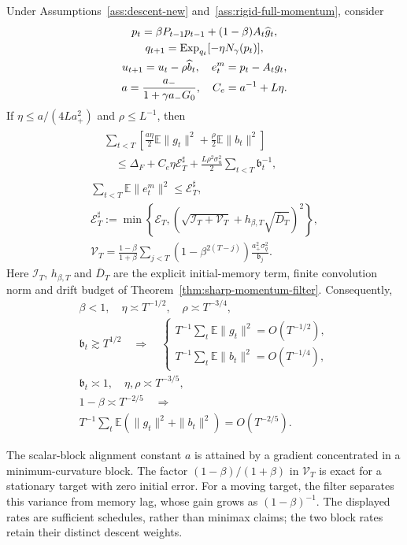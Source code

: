 \begin{theorem}
Under Assumptions~\ref{ass:descent-new} and~\ref{ass:rigid-full-momentum}, consider
\begin{gather}
 p_t=\beta P_{t-1}p_{t-1}+(1-\beta)A_t\widehat g_t,\\
 q_{t+1}=\operatorname{Exp}_{q_t}[-\eta N_\gamma(p_t)],\\
 u_{t+1}=u_t-\rho\widehat b_t,\quad e_t^m=p_t-A_tg_t,\\
 a=\frac{a_-}{1+\gamma a_-G_0},\quad C_e=a^{-1}+L\eta.
\end{gather}
If $\eta\le a/(4La_+^2)$ and $\rho\le L^{-1}$, then
\begin{gather}
 \begin{aligned}
 &\sum_{t<T}\left[\frac{a\eta}{2}\mathbb E\|g_t\|^2+
 \frac\rho2\mathbb E\|b_t\|^2\right]\\
 &\quad\le\Delta_F+C_e\eta\mathscr E_T^\sharp+
 \frac{L\rho^2\sigma_u^2}{2}\sum_{t<T}\mathfrak b_t^{-1},
 \end{aligned}\\
 \sum_{t<T}\mathbb E\|e_t^m\|^2\le\mathscr E_T^\sharp,\\
 \mathscr E_T^\sharp:=\min\left\{\mathscr E_T,
 \left(\sqrt{\mathcal I_T+\mathcal V_T}+h_{\beta,T}\sqrt{\overline D_T}\right)^2\right\},\\
 \mathcal V_T=\frac{1-\beta}{1+\beta}\sum_{j<T}
 (1-\beta^{2(T-j)})\frac{a_+^2\sigma_q^2}{\mathfrak b_j}.
\end{gather}
Here $\mathcal I_T$, $h_{\beta,T}$ and $\overline D_T$ are the explicit initial-memory term, finite convolution norm and drift budget of Theorem~\ref{thm:sharp-momentum-filter}. Consequently,
\begin{gather}
 \beta<1,\quad\eta\asymp T^{-1/2},\quad\rho\asymp T^{-3/4},\\
 \mathfrak b_t\gtrsim T^{1/2}\quad\Longrightarrow\quad
 \begin{cases}
 T^{-1}\sum_t\mathbb E\|g_t\|^2=O(T^{-1/2}),\\
 T^{-1}\sum_t\mathbb E\|b_t\|^2=O(T^{-1/4}),
 \end{cases}\\
 \mathfrak b_t\asymp1,\quad\eta,\rho\asymp T^{-3/5},\\
 1-\beta\asymp T^{-2/5}\quad\Longrightarrow\\[-4pt]
 T^{-1}\sum_t\mathbb E(\|g_t\|^2+\|b_t\|^2)=O(T^{-2/5}).
\end{gather}
\end{theorem}
The scalar-block alignment constant $a$ is attained by a gradient concentrated in a minimum-curvature block. The factor $(1-\beta)/(1+\beta)$ in $\mathcal V_T$ is exact for a stationary target with zero initial error. For a moving target, the filter separates this variance from memory lag, whose gain grows as $(1-\beta)^{-1}$. The displayed rates are sufficient schedules, rather than minimax claims; the two block rates retain their distinct descent weights.

